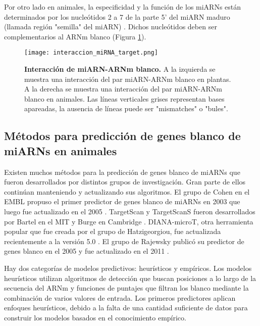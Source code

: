 Por otro lado en animales, la especificidad y la función de los miARNs están determinados por los nucleótidos 2 a 7 de la parte 5' del miARN maduro (llamada región "semilla" del miARN) \citep{pmid12672692}.
Dichos nucleótidos deben ser complementarios al ARNm blanco (Figura \ref{fig:interaccion_miRNA_target}).

\begin{figure}[htbp!] 
	\centering    
	\texttt{[image: interaccion\_miRNA\_target.png]}
	\caption[Interacción de miARN-ARNm blanco]{
		\textbf{Interacción de miARN-ARNm blanco.}
        A la izquierda se muestra una interacción del par miARN-ARNm blanco en plantas.
        A la derecha se muestra una interacción del par miARN-ARNm blanco en animales.
        Las líneas verticales grises representan bases apareadas, la ausencia de líneas puede ser "mismatches" o "bules".
	}
	\label{fig:interaccion_miRNA_target}
\end{figure}


\subsection{Métodos para predicción de genes blanco de miARNs en animales}
Existen muchos métodos para la predicción de genes blanco de miARNs que fueron desarrollados por distintos grupos de investigación.
Gran parte de ellos continúan manteniendo y actualizando sus algoritmos. El grupo de Cohen en el EMBL propuso el primer predictor de genes blanco de miARNs en 2003 \citep{pmid14691535} que luego fue actualizado en el 2005 \citep{pmid16337999}.
TargetScan y TargetScanS fueron desarrollados por Bartel en el MIT y Burge en Cambridge \citep{pmid18955434,pmid17612493,pmid14697198,pmid15652477}.
DIANA-microT, otra herramienta popular que fue creada por el grupo de Hatzigeorgiou, fue actualizada recientemente a la versión 5.0 \citep{pmid19765283,pmid21551220,pmid23680784}.
El grupo de Rajewsky publicó su predictor de genes blanco en el 2005 y fue actualizado en el 2011 \citep{pmid15383676,pmid22086949}. 

Hay dos categorías de modelos predictivos: heurísticos y empíricos.
Los modelos heurísticos utilizan algoritmos de detección que buscan posiciones a lo largo de la secuencia del ARNm y funciones de puntajes que filtran los blanco mediante la combinación de varios valores de entrada.
Los primeros predictores aplican enfoques heurísticos, debido a la falta de una cantidad suficiente de datos para construir los modelos basados en el conocimiento empírico.

